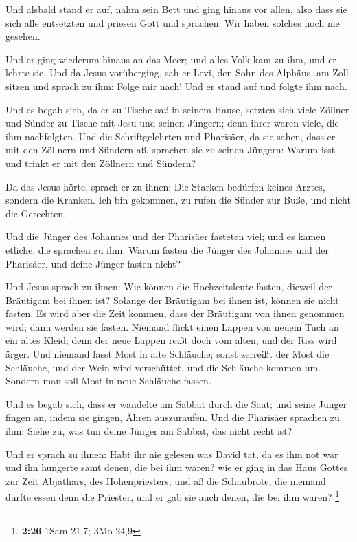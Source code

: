  Und alsbald stand er auf, nahm sein Bett und ging hinaus
vor allen, also dass sie sich alle entsetzten und priesen Gott und
sprachen: Wir haben solches noch nie gesehen.

 Und er ging wiederum hinaus an das Meer; und alles Volk
kam zu ihm, und er lehrte sie.  Und da Jesus vorüberging,
sah er Levi, den Sohn des Alphäus, am Zoll sitzen und sprach zu ihm:
Folge mir nach! Und er stand auf und folgte ihm nach.

 Und es begab sich, da er zu Tische saß in seinem Hause,
setzten sich viele Zöllner und Sünder zu Tische mit Jesu und seinen
Jüngern; denn ihrer waren viele, die ihm nachfolgten.  Und
die Schriftgelehrten und Pharisäer, da sie sahen, dass er mit den
Zöllnern und Sündern aß, sprachen sie zu seinen Jüngern: Warum isst und
trinkt er mit den Zöllnern und Sündern?

 Da das Jesus hörte, sprach er zu ihnen: Die Starken
bedürfen keines Arztes, sondern die Kranken. Ich bin gekommen, zu rufen
die Sünder zur Buße, und nicht die Gerechten.

 Und die Jünger des Johannes und der Pharisäer fasteten
viel; und es kamen etliche, die sprachen zu ihm: Warum fasten die Jünger
des Johannes und der Pharisäer, und deine Jünger fasten nicht?

 Und Jesus sprach zu ihnen: Wie können die Hochzeitsleute
fasten, dieweil der Bräutigam bei ihnen ist? Solange der Bräutigam bei
ihnen ist, können sie nicht fasten.  Es wird aber die Zeit
kommen, dass der Bräutigam von ihnen genommen wird; dann werden sie
fasten.  Niemand flickt einen Lappen von neuem Tuch an ein
altes Kleid; denn der neue Lappen reißt doch vom alten, und der Riss
wird ärger.  Und niemand fasst Most in alte Schläuche;
sonst zerreißt der Most die Schläuche, und der Wein wird verschüttet,
und die Schläuche kommen um. Sondern man soll Most in neue Schläuche
fassen.

 Und es begab sich, dass er wandelte am Sabbat durch die
Saat; und seine Jünger fingen an, indem sie gingen, Ähren auszuraufen.
 Und die Pharisäer sprachen zu ihm: Siehe zu, was tun deine
Jünger am Sabbat, das nicht recht ist?

 Und er sprach zu ihnen: Habt ihr nie gelesen was David
tat, da es ihm not war und ihn hungerte samt denen, die bei ihm waren?
 wie er ging in das Haus Gottes zur Zeit Abjathars, des
Hohenpriesters, und aß die Schaubrote, die niemand durfte essen denn die
Priester, und er gab sie auch denen, die bei ihm waren? \footnote{\textbf{2:26}
  1Sam 21,7; 3Mo 24,9}

